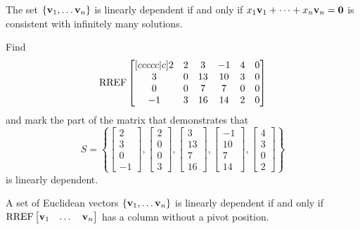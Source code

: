 \begin{applicationActivities}
\begin{fact}
  The set \(\{\mathbf v_1,\dots\mathbf v_n\}\) is linearly dependent if and only
  if \(x_1\mathbf v_1+\dots+x_n\mathbf v_n=\mathbf 0\) is consistent with
  infinitely many solutions.
\end{fact}

\begin{activity}{10}
  Find
  \[\operatorname{RREF}\begin{bmatrix}[ccccc|c]
  2&2&3&-1&4&0\\
  3&0&13&10&3&0\\
  0&0&7&7&0&0\\
  -1&3&16&14&2&0
  \end{bmatrix}
  \]
  and mark the part of the matrix that demonstrates that
  \[S=\left\{
  \begin{bmatrix}2\\3\\0\\-1\end{bmatrix},
  \begin{bmatrix}2\\0\\0\\3\end{bmatrix},
  \begin{bmatrix}3\\13\\7\\16\end{bmatrix},
  \begin{bmatrix}-1\\10\\7\\14\end{bmatrix},
  \begin{bmatrix}4\\3\\0\\2\end{bmatrix}
  \right\}
  \]
  is linearly dependent.
\end{activity}

\begin{fact}
  A set of Euclidean vectors
  \(\{\mathbf v_1,\dots\mathbf v_n\}\) is linearly dependent if and only
  if \(\operatorname{RREF}\begin{bmatrix}\mathbf v_1&\dots&\mathbf v_n\end{bmatrix}\)
  has a column without a pivot position.
\end{fact}


\end{applicationActivities}
